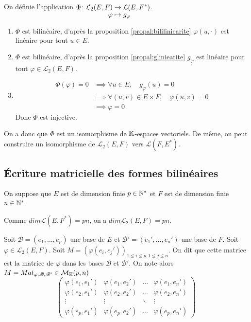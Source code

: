 \documentclass[a4paper,12pt]{article}
\begin{document}
\begin{demonstration}
    On définie l'application $\funcdef{\Phi}{\mathcal{L}_2(E, F)}{\mathcal{L}(E, F^*)}{\varphi}{g_\varphi}$.

    \begin{enumerate}
        \item $\Phi$ est bilinéaire, d'après la proposition \ref{propal:bililiniearite} $\varphi(u, \cdot)$ est linéaire pour tout $u \in E$.
        \item $\Phi$ est bilinéaire, d'après la proposition \ref{propal:gliniearite} $g_\varphi$ est linéaire pour tout $\varphi \in \mathcal{L}_2(E, F)$.
        
        \item
        \begin{align*}
            \Phi(\varphi) = 0 &\implies \forall u \in E, \quad g_\varphi(u) = 0 \\
            &\implies \forall (u, v) \in E \times F, \quad \varphi(u, v) = 0 \\
            &\implies \varphi = 0
        \end{align*}
        Donc $\Phi$ est injective.
        
    \end{enumerate}
    On a donc que $\Phi$ est un isomorphisme de $\mathbb{K}$-espaces vectoriels. De même, on peut construire un isomorphisme de $\mathcal{L}_2(E, F)$ vers $\mathcal{L}(F, E^*)$.
\end{demonstration}

\subsection{Écriture matricielle des formes bilinéaires}

\begin{remarque}
    On suppose que $E$ est de dimension finie $p \in \mathbb{N}^*$ et $F$ est de dimension finie $n \in \mathbb{N}^*$.

    Comme $dim \mathcal{L}(E, F^*) = pn$, on a $dim \mathcal{L}_2(E, F) = pn$.
\end{remarque}

\begin{definition}
    Soit $\mathscr{B} = (e_1, \dots, e_p)$ une base de $E$ et $\mathscr{B'} = (e_1', \dots, e_n')$ une base de $F$.
    Soit $\varphi \in \mathcal{L}_2(E, F)$. Soit $M = (\varphi(e_i, e_j'))_{1 \leq i \leq p, 1 \leq j \leq n}$.
    On dit que cette matrice est la matrice de $\varphi$ dans les bases $\mathscr{B}$ et $\mathscr{B'}$.
    On note alors $M = Mat_{\varphi; \mathscr{B}, \mathscr{B'}} \in \mathcal{M}_{\mathbb{K}}(p, n)$
    $$
    \begin{pmatrix}
        \varphi(e_1, e_1') & \varphi(e_1, e_2') & \dots & \varphi(e_1, e_n') \\
        \varphi(e_2, e_1') & \varphi(e_2, e_2') & \dots & \varphi(e_2, e_n') \\
        \vdots & \vdots & \ddots & \vdots \\
        \varphi(e_p, e_1') & \varphi(e_p, e_2') & \dots & \varphi(e_p, e_n')
    \end{pmatrix}
    $$
\end{definition}
\end{document}
